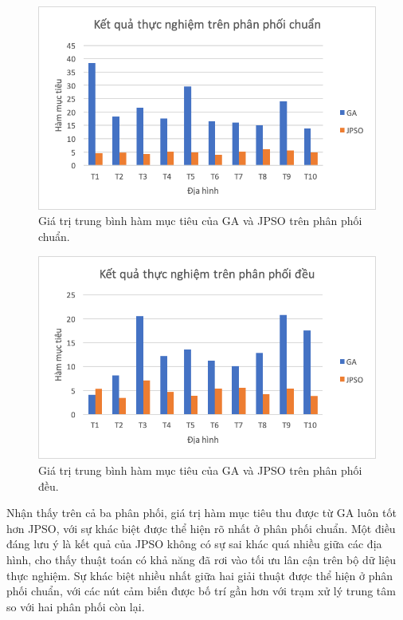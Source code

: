 \documentclass{hust}
\begin{document}
\begin{figure}[H]
	\centering
	\includegraphics[scale=0.5]{images/MediumNorm30.png}
	\caption{Giá trị trung bình hàm mục tiêu của \gls{GA} và \gls{JPSO} trên phân phối chuẩn.} \label{fig:medium_norm}
\end{figure}

\begin{figure}[H]
	\centering
	\includegraphics[scale=0.5]{images/MediumUniform30.png}
	\caption{Giá trị trung bình hàm mục tiêu của \gls{GA} và \gls{JPSO} trên phân phối đều.} \label{fig:medium_uniform}
\end{figure}


Nhận thấy trên cả ba phân phối, giá trị hàm mục tiêu thu được từ \gls{GA} luôn tốt hơn \gls{JPSO}, với sự khác biệt được thể hiện rõ nhất ở phân phối chuẩn. Một điều đáng lưu ý là kết quả của \gls{JPSO} không có sự sai khác quá nhiều giữa các địa hình, cho thấy thuật toán có khả năng đã rơi vào tối ưu lân cận trên bộ dữ liệu thực nghiệm. Sự khác biệt nhiều nhất giữa hai giải thuật được thể hiện ở phân phối chuẩn, với các nút cảm biến được bố trí gần hơn với trạm xử lý trung tâm so với hai phân phối còn lại.
\end{document}

